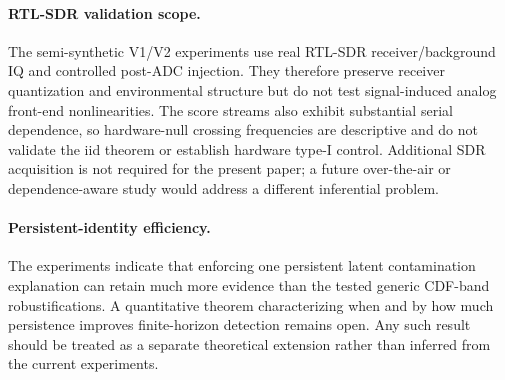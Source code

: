 \paragraph{RTL-SDR validation scope.}
The semi-synthetic V1/V2 experiments use real RTL-SDR receiver/background IQ and controlled post-ADC injection. They therefore preserve receiver quantization and environmental structure but do not test signal-induced analog front-end nonlinearities. The score streams also exhibit substantial serial dependence, so hardware-null crossing frequencies are descriptive and do not validate the iid theorem or establish hardware type-I control. Additional SDR acquisition is not required for the present paper; a future over-the-air or dependence-aware study would address a different inferential problem.

\paragraph{Persistent-identity efficiency.}
The experiments indicate that enforcing one persistent latent contamination explanation can retain much more evidence than the tested generic CDF-band robustifications. A quantitative theorem characterizing when and by how much persistence improves finite-horizon detection remains open. Any such result should be treated as a separate theoretical extension rather than inferred from the current experiments.

